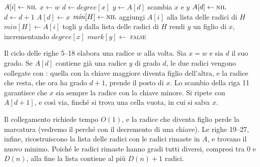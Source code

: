 \begin{algorithm}[htbp]
\caption{Il consolidamento della lista delle radici: due radici dello stesso grado vengono collegate, finché restano radici con gradi tutti diversi.}\label{alg:hf-consolidate}
\begin{algorithmic}[1]
    \State $A[i] \gets \textsc{nil}$
  \EndFor
    \State $x \gets w$
    \State $d \gets \mathit{degree}[x]$
      \State $y \gets A[d]$ 
        \State scambia $x$ e $y$
      \EndIf
      \State {}
      \State $A[d] \gets \textsc{nil}$
      \State $d \gets d + 1$
    \EndWhile
    \State $A[d] \gets x$
  \EndFor
  \State $\mathit{min}[H] \gets \textsc{nil}$
      \State aggiungi $A[i]$ alla lista delle radici di $H$
        \State $\mathit{min}[H] \gets A[i]$
      \EndIf
    \EndIf
  \EndFor
\EndProcedure
\Statex
{}
  \State togli $y$ dalla lista delle radici di $H$
  \State rendi $y$ un figlio di $x$, incrementando $\mathit{degree}[x]$
  \State $\mathit{mark}[y] \gets$ \textsc{false}
\EndProcedure
\end{algorithmic}
\end{algorithm}

Il ciclo delle righe 5--18 elabora una radice $w$ alla volta. Sia $x = w$ e sia $d$ il suo grado. Se $A[d]$ contiene già una radice $y$ di grado $d$, le due radici vengono collegate con \FibHeapLink{}: quella con la chiave maggiore diventa figlio dell'altra, e la radice che resta, che ora ha grado $d+1$, prende il posto di $x$. Lo scambio della riga 11 garantisce che $x$ sia sempre la radice con la chiave minore. Si ripete con $A[d+1]$, e così via, finché si trova una cella vuota, in cui si salva $x$.

Il collegamento richiede tempo $O(1)$, e la radice che diventa figlio perde la marcatura (vedremo il perché con il decremento di una chiave). Le righe 19--27, infine, ricostruiscono la lista delle radici con le radici rimaste in $A$, e trovano il nuovo minimo. Poiché le radici rimaste hanno gradi tutti diversi, compresi tra $0$ e $D(n)$, alla fine la lista contiene al più $D(n) + 1$ radici.

